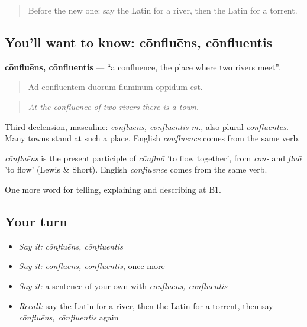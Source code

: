 \label{lesson:LA-C482-confluens}



\begin{quote}
Before the new one: say the Latin for a river, then the Latin for a torrent.
\end{quote}

\subsection*{You'll want to know: cōnfluēns, cōnfluentis}
\textbf{cōnfluēns, cōnfluentis} — \textquotedblleft{}a confluence, the place where two rivers meet\textquotedblright{}.

\begin{quote}
Ad cōnfluentem duōrum flūminum oppidum est.
\end{quote}

\begin{quote}
\emph{At the confluence of two rivers there is a town.}
\end{quote}

Third declension, masculine: \emph{cōnfluēns, cōnfluentis m.}, also plural \emph{cōnfluentēs}. Many towns stand at such a place. English \emph{confluence} comes from the same verb.

\begin{cousinweb}
\emph{cōnfluēns} is the present participle of \emph{cōnfluō} 'to flow together', from \emph{con-} and \emph{fluō} 'to flow' (Lewis \& Short). English \emph{confluence} comes from the same verb.
\end{cousinweb}

\begin{grammarlens}[title={What you've built}]
One more word for telling, explaining and describing at B1.
\end{grammarlens}

\subsection*{Your turn}
\begin{itemize}
\raggedright
  \item \emph{Say it:} \emph{cōnfluēns, cōnfluentis}
  \item \emph{Say it:} \emph{cōnfluēns, cōnfluentis}, once more
  \item \emph{Say it:} a sentence of your own with \emph{cōnfluēns, cōnfluentis}
  \item \emph{Recall:} say the Latin for a river, then the Latin for a torrent, then say \emph{cōnfluēns, cōnfluentis} again
\end{itemize}

